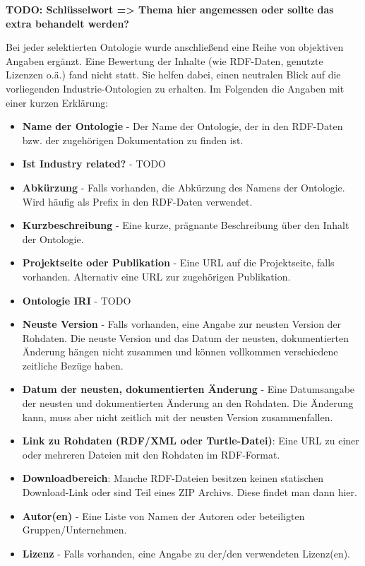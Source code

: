\documentclass{article}
\begin{document}
\textbf{TODO: Schlüsselwort => Thema hier angemessen oder sollte das extra behandelt werden?}

Bei jeder selektierten Ontologie wurde anschließend eine Reihe von objektiven Angaben ergänzt.
Eine Bewertung der Inhalte (wie RDF-Daten, genutzte Lizenzen o.ä.) fand nicht statt.
Sie helfen dabei, einen neutralen Blick auf die vorliegenden Industrie-Ontologien zu erhalten.
Im Folgenden die Angaben mit einer kurzen Erklärung:

\begin{itemize}
    \item \textbf{Name der Ontologie} - Der Name der Ontologie, der in den RDF-Daten bzw. der zugehörigen Dokumentation zu finden ist.
    \item \textbf{Ist Industry related?} - TODO
    \item \textbf{Abkürzung} - Falls vorhanden, die Abkürzung des Namens der Ontologie. Wird häufig als Prefix in den RDF-Daten verwendet.
    \item \textbf{Kurzbeschreibung} - Eine kurze, prägnante Beschreibung über den Inhalt der Ontologie.
    \item \textbf{Projektseite oder Publikation} - Eine URL auf die Projektseite, falls vorhanden. Alternativ eine URL zur zugehörigen Publikation.
    \item \textbf{Ontologie IRI} - TODO
    \item \textbf{Neuste Version} - Falls vorhanden, eine Angabe zur neusten Version der Rohdaten. Die neuste Version und das Datum der neusten, dokumentierten Änderung hängen nicht zusammen und können vollkommen verschiedene zeitliche Bezüge haben.
    \item \textbf{Datum der neusten, dokumentierten Änderung} - Eine Datumsangabe der neusten und dokumentierten Änderung an den Rohdaten. Die Änderung kann, muss aber nicht zeitlich mit der neusten Version zusammenfallen.
    \item \textbf{Link zu Rohdaten (RDF/XML oder Turtle-Datei)}: Eine URL zu einer oder mehreren Dateien mit den Rohdaten im RDF-Format.
    \item \textbf{Downloadbereich}: Manche RDF-Dateien besitzen keinen statischen Download-Link oder sind Teil eines ZIP Archivs. Diese findet man dann hier.
    \item \textbf{Autor(en)} - Eine Liste von Namen der Autoren oder beteiligten Gruppen/Unternehmen.
    \item \textbf{Lizenz} - Falls vorhanden, eine Angabe zu der/den verwendeten Lizenz(en).
\end{itemize}
\end{document}
